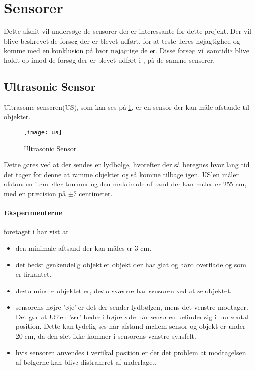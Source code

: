 \section{Sensorer}
Dette afsnit vil undersøge de sensorer der er interessante for dette projekt.
Der vil blive beskrevet de forsøg der er blevet udført, for at teste deres nøjagtighed og komme med en konklusion på hvor nøjagtige de er.
Disse forsøg vil samtidig blive holdt op imod de forsøg der er blevet udført i \cite{tikNXT}, på de samme sensorer.

\subsection{Ultrasonic Sensor}
Ultrasonic sensoren(US), som kan ses på \cref{sensor:ultrasonic_sensor}, er en sensor der kan måle afstande til objekter.

\begin{figure}[h]
\centering
\texttt{[image: us]}
\caption{\legoms Ultrasonic Sensor}
\label{sensor:ultrasonic_sensor}
\end{figure}

Dette gøres ved at der sendes en lydbølge, hvorefter der så beregnes hvor lang tid det tager for denne at ramme objektet og så komme tilbage igen.
US'en måler afstanden i cm eller tommer og den maksimale aftsand der kan måles er 255 cm, med en præcision på $\pm$3 centimeter.\cite{tikNXT}

\paragraph{Eksperimenterne} foretaget i \cite{tikNXT} har vist at
\begin{itemize}
\item den minimale aftsand der kan måles er 3 cm.
\item det bedst genkendelig objekt et objekt der har glat og hård overflade og som er firkantet.
\item desto mindre objektet er, desto sværere har sensoren ved at se objektet.
\item sensorens højre 'øje' er det der sender lydbølgen, mens det venstre modtager.
Det gør at US'en 'ser' bedre i højre side når sensoren befinder sig i horisontal position.
Dette kan tydelig ses når afstand mellem sensor og objekt er under 20 cm, da den slet ikke kommer i sensorens venstre synsfelt.
\item hvis sensoren anvendes i vertikal position er der det problem at modtagelsen af bølgerne kan blive distraheret af underlaget.
\end{itemize}

